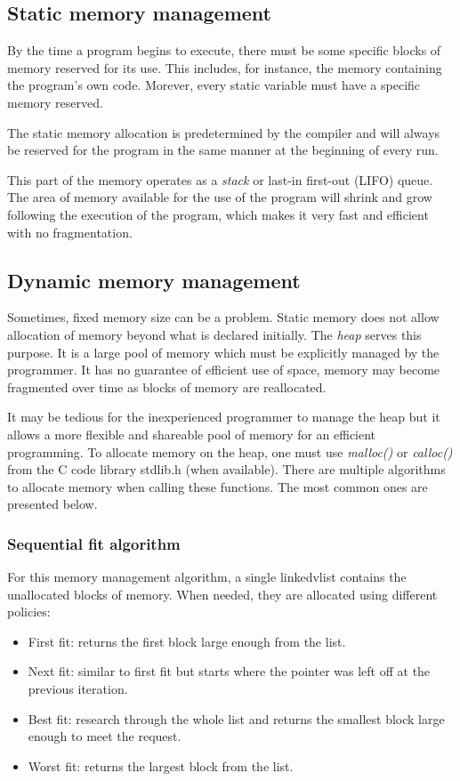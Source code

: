 \subsection{Static memory management}
By the time a program begins to execute, there must be some specific blocks of memory reserved for its use.
This includes, for instance, the memory containing the program's own code.
Morever, every static variable must have a specific memory reserved.

The static memory allocation is predetermined by the compiler
    and will always be reserved for the program in the same manner at the beginning of every run.

This part of the memory operates as a \textit{stack} or last-in first-out (LIFO) queue.
The area of memory available for the use of the program will shrink and grow following the execution of the program,
which makes it very fast and efficient with no fragmentation.

\subsection{Dynamic memory management}
Sometimes, fixed memory size can be a problem.
Static memory does not allow allocation of memory beyond what is declared initially.
The \textit{heap} serves this purpose.
It is a large pool of memory which must be explicitly managed by the programmer.
It has no guarantee of efficient use of space, memory may become fragmented over time as blocks of memory are reallocated.

It may be tedious for the inexperienced programmer to manage the heap
    but it allows a more flexible and shareable pool of memory for an efficient programming.
To allocate memory on the heap, one must use \textit{malloc()} or \textit{calloc()} from the C code library stdlib.h (when available).
There are multiple algorithms to allocate memory when calling these functions.
The most common ones are presented below.

\subsubsection{Sequential fit algorithm}
For this memory management algorithm, a single linkedvlist contains the unallocated blocks of memory.
When needed, they are allocated using different policies:
\begin{itemize}
    \item First fit: returns the first block large enough from the list.
    \item Next fit: similar to first fit but starts where the pointer was left off at the previous iteration.
    \item Best fit: research through the whole list and returns the smallest block large enough to meet the request.
    \item Worst fit: returns the largest block from the list.
\end{itemize}

